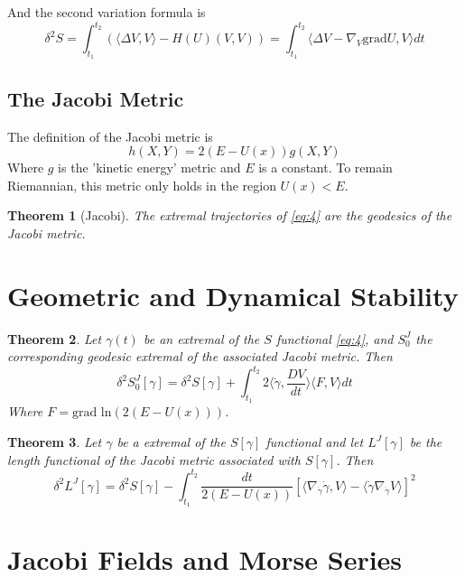 \documentclass[notitlepage]{article}
\newtheorem{thm}{Theorem}
\begin{document}
And the second variation formula is 
\begin{equation}\label{eq:6}
    \delta^2 S = \int_{t_1}^{t_2} \left( \langle \Delta V, V \rangle - H(U)(V,V) \right) = \int_{t_1}^{t_2}\langle \Delta V - \nabla_V \mathrm{grad}U, V \rangle dt
\end{equation}

\subsection{The Jacobi Metric}
\indent The definition of the Jacobi metric is 
$$h(X,Y) = 2(E-U(x))g(X,Y)$$
\indent Where $g$ is the 'kinetic energy' metric and $E$ is a constant. To remain Riemannian, this metric only holds in the region $U(x) < E$.

\begin{thm}[Jacobi]
The extremal trajectories of \ref{eq:4} are the geodesics of the Jacobi metric.
\end{thm}

\section{Geometric and Dynamical Stability}
\begin{thm}

Let $\gamma(t)$ be an extremal of the $S$ functional \ref{eq:4}, and $S_0^J$ the corresponding geodesic extremal of the associated Jacobi metric. Then 
\begin{equation}\label{eq:7}
    \delta^2 S_0^J[\gamma] = \delta^2 S[\gamma] + \int_{t_1}^{t_2} 2 \langle \dot{\gamma}, \frac{DV}{dt}\rangle \langle F, V \rangle dt
\end{equation}
\indent Where $F=\text{grad ln}(2(E-U(x)))$.
\end{thm}

\begin{thm}
Let $\gamma$ be a extremal of the $S[\gamma]$ functional and let $L^J[\gamma]$ be the length functional of the Jacobi metric associated with $S[\gamma]$. Then
\begin{equation}\label{eq:8}
    \delta^2L^J[\gamma] = \delta^2 S[\gamma] - \int_{t_1}^{t_2} \frac{dt}{2(E-U(x))}[\langle \nabla_{\dot{\gamma}} \dot{\gamma}, V \rangle - \langle \dot{\gamma} \nabla_{\dot{\gamma}}V \rangle]^2
\end{equation}
\end{thm}

\section{Jacobi Fields and Morse Series}
\end{document}
